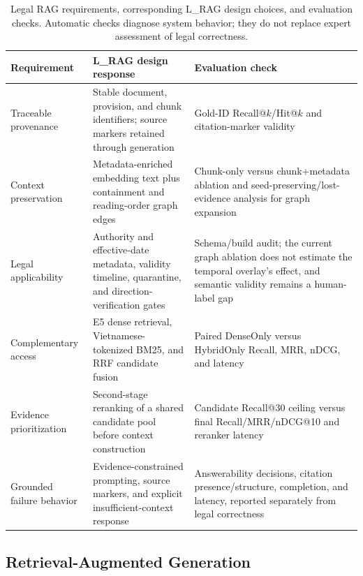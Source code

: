 \begin{table}[!t]
\centering
\footnotesize
\caption{Legal RAG requirements, corresponding L\_RAG design choices, and
evaluation checks. Automatic checks diagnose system behavior; they do not
replace expert assessment of legal correctness.}
\label{tab:legal-rag-requirements}
\begin{tabular}{@{}>{\raggedright\arraybackslash}p{}
                    >{\raggedright\arraybackslash}p{}
                    >{\raggedright\arraybackslash}p{}@{}}
\toprule
\textbf{Requirement} & \textbf{L\_RAG design response} &
\textbf{Evaluation check} \\
\midrule
Traceable provenance & Stable document, provision, and chunk identifiers;
source markers retained through generation & Gold-ID Recall@$k$/Hit@$k$ and
citation-marker validity \\
Context preservation & Metadata-enriched embedding text plus containment and
reading-order graph edges & Chunk-only versus chunk+metadata ablation and
seed-preserving/lost-evidence analysis for graph expansion \\
Legal applicability & Authority and effective-date metadata, validity
timeline, quarantine, and direction-verification gates & Schema/build audit;
the current graph ablation does not estimate the temporal overlay's effect,
and semantic validity remains a human-label gap \\
Complementary access & E5 dense retrieval, Vietnamese-tokenized BM25, and RRF
candidate fusion & Paired DenseOnly versus HybridOnly Recall, MRR, nDCG, and
latency \\
Evidence prioritization & Second-stage reranking of a shared candidate pool
before context construction & Candidate Recall@30 ceiling versus final
Recall/MRR/nDCG@10 and reranker latency \\
Grounded failure behavior & Evidence-constrained prompting, source markers,
and explicit insufficient-context response & Answerability decisions,
citation presence/structure, completion, and latency, reported separately
from legal correctness \\
\bottomrule
\end{tabular}
\end{table}

\subsection{Retrieval-Augmented Generation}
\label{sec:related-rag}

